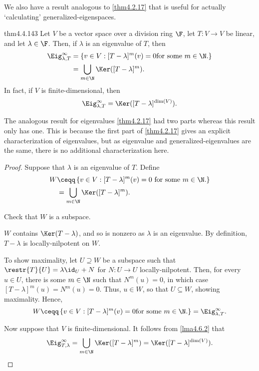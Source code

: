 We also have a result analogous to \cref{thm4.2.17} that is useful for actually `calculating' generalized-eigenspaces.
\begin{thm}{}{thm4.4.143}
	Let $V$ be a vector space over a division ring $\F$, let $T\colon V\rightarrow V$ be linear, and let $\lambda \in \F$.  Then, if $\lambda$ is an eigenvalue of $T$, then
	\begin{equation}
		\begin{split}
			\Eig _{\lambda ,T}^{\infty} & =\left\{ v\in V:[T-\lambda ]^m(v)=0\text{for some }m\in \N \text{.}\right\} \\
			& =\bigcup _{m\in \N}\Ker ([T-\lambda ]^m).
		\end{split}
	\end{equation}
	In fact, if $V$ is finite-dimensional, then
	\begin{equation}
		\Eig _{\lambda ,T}^{\infty}=\Ker ([T-\lambda ]^{\dim (V)}).
	\end{equation}
	\begin{rmk}
		The analogous result for eigenvalues \cref{thm4.2.17} had two parts whereas this result only has one.  This is because the first part of \cref{thm4.2.17} gives an explicit characterization of eigenvalues, but as eigenvalue and generalized-eigenvalues are the same, there is no additional characterization here.
	\end{rmk}
	\begin{proof}
		Suppose that $\lambda$ is an eigenvalue of $T$.  Define
		\begin{equation}
			\begin{split}
				W & \ceqq \left\{ v\in V:[T-\lambda ]^m(v)=0\text{ for some }m\in \N \text{.}\right\} \\
				& =\bigcup _{m\in \N}\Ker ([T-\lambda ]^m).
			\end{split}
		\end{equation}
		\begin{exr}[breakable=false]{}{}
			Check that $W$ is a subspace.
		\end{exr}
		$W$ contains $\Ker (T-\lambda )$, and so is nonzero as $\lambda$ is an eigenvalue.  By definition, $T-\lambda$ is locally-nilpotent on $W$.
		
		To show maximality, let $U\supseteq W$ be a subspace such that $\restr{T}{U}=\lambda \id _U+N$ for $N\colon U\rightarrow U$ locally-nilpotent.  Then, for every $u\in U$, there is some $m\in \N$ such that $N^m(u)=0$, in which case $[T-\lambda ]^m(u)=N^m(u)=0$.  Thus, $u\in W$, so that $U\subseteq W$, showing maximality.  Hence,
		\begin{equation}
		W\ceqq \left\{ v\in V:[T-\lambda ]^m(v)=0\text{for some }m\in \N \text{.}\right\} =\Eig _{\lambda ,T}^{\infty}.
		\end{equation}
		
		Now suppose that $V$ is finite-dimensional.  It follows from \cref{lma4.6.2} that
		\begin{equation}
			\Eig _{T,\lambda}^{\infty}=\bigcup _{m\in \N}\Ker ([T-\lambda ]^m)=\Ker ([T-\lambda ]^{\dim (V)}).
		\end{equation}
	\end{proof}
\end{thm}
